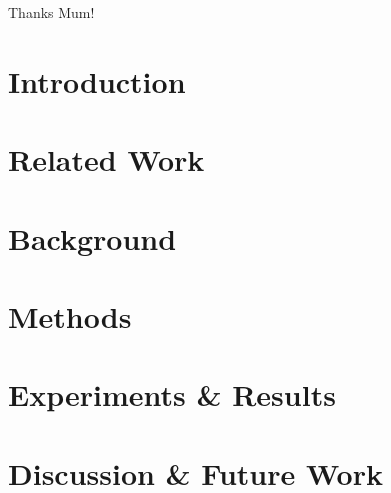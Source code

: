 \documentclass{article}
\makeatletter
\let\oldabstract\abstract
\let\oldendabstract\endabstract
\renewenvironment{abstract}
{\renewenvironment{quotation}%
               {\list{}{\addtolength{\leftmargin}{3em} %
                        \listparindent 1.5em%
                        \itemindent    \listparindent%
                        \rightmargin   \leftmargin%
                        \parsep        \z@ \@plus\p@}%
                \item\relax}%
               {\endlist}%
\oldabstract}
{\oldendabstract}
\makeatother
\begin{document}
\renewcommand{\abstractname}{Acknowledgements}
\begin{abstract}
 Thanks Mum!
\end{abstract}

\newpage
\tableofcontents
\newpage
\listoffigures
\listoftables
\newpage
{}

\section{Introduction}


\section{Related Work}


\section{Background}


\section{Methods}

\label{sec:mthods}

\section{Experiments \& Results}


% 

\section{Discussion \& Future Work}

\label{sec:discus}

% 

% 

\newpage

\printbibliography
\newpage
\renewcommand{\appendixname}{Annex}
\renewcommand{\appendixtocname}{Annex}
\renewcommand{\appendixpagename}{Annex}

\begin{appendices}
    
    \newpage
        
\end{appendices}
\end{document}
